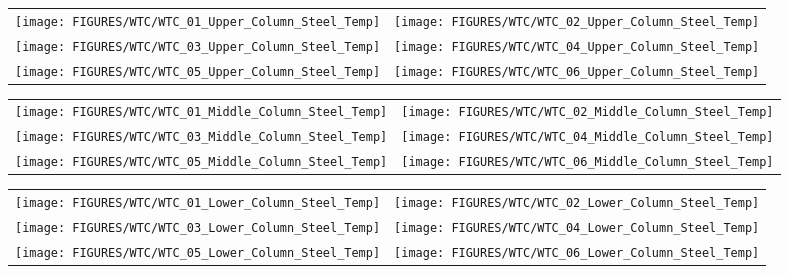 \begin{figure}[p]
\begin{tabular*}{\textwidth}{l@{\extracolsep{\fill}}r}
\texttt{[image: FIGURES/WTC/WTC\_01\_Upper\_Column\_Steel\_Temp]} &
\texttt{[image: FIGURES/WTC/WTC\_02\_Upper\_Column\_Steel\_Temp]} \\
\texttt{[image: FIGURES/WTC/WTC\_03\_Upper\_Column\_Steel\_Temp]} &
\texttt{[image: FIGURES/WTC/WTC\_04\_Upper\_Column\_Steel\_Temp]} \\
\texttt{[image: FIGURES/WTC/WTC\_05\_Upper\_Column\_Steel\_Temp]} &
\texttt{[image: FIGURES/WTC/WTC\_06\_Upper\_Column\_Steel\_Temp]}
\end{tabular*}
\label{NIST_WTC_Upper_Column_Steel}
\end{figure}

\begin{figure}[p]
\begin{tabular*}{\textwidth}{l@{\extracolsep{\fill}}r}
\texttt{[image: FIGURES/WTC/WTC\_01\_Middle\_Column\_Steel\_Temp]} &
\texttt{[image: FIGURES/WTC/WTC\_02\_Middle\_Column\_Steel\_Temp]} \\
\texttt{[image: FIGURES/WTC/WTC\_03\_Middle\_Column\_Steel\_Temp]} &
\texttt{[image: FIGURES/WTC/WTC\_04\_Middle\_Column\_Steel\_Temp]} \\
\texttt{[image: FIGURES/WTC/WTC\_05\_Middle\_Column\_Steel\_Temp]} &
\texttt{[image: FIGURES/WTC/WTC\_06\_Middle\_Column\_Steel\_Temp]}
\end{tabular*}
\label{NIST_WTC_Middle_Column_Steel}
\end{figure}

\begin{figure}[p]
\begin{tabular*}{\textwidth}{l@{\extracolsep{\fill}}r}
\texttt{[image: FIGURES/WTC/WTC\_01\_Lower\_Column\_Steel\_Temp]} &
\texttt{[image: FIGURES/WTC/WTC\_02\_Lower\_Column\_Steel\_Temp]} \\
\texttt{[image: FIGURES/WTC/WTC\_03\_Lower\_Column\_Steel\_Temp]} &
\texttt{[image: FIGURES/WTC/WTC\_04\_Lower\_Column\_Steel\_Temp]} \\
\texttt{[image: FIGURES/WTC/WTC\_05\_Lower\_Column\_Steel\_Temp]} &
\texttt{[image: FIGURES/WTC/WTC\_06\_Lower\_Column\_Steel\_Temp]}
\end{tabular*}
\label{NIST_WTC_Lower_Column_Steel}
\end{figure}

